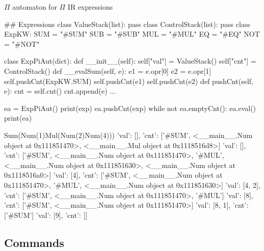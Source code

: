 \documentclass{beamer}
\begin{document}

\begin{frame}{{\color{red}$\Pi$ automaton} for {\color{red}$\Pi$ IR} expressions}

\begin{python}
## Expressions
class ValueStack(list): pass
class ControlStack(list): pass
class ExpKW:
    SUM = "#SUM"
    SUB = "#SUB"
    MUL = "#MUL"
    EQ = "#EQ"
    NOT = "#NOT"
\end{python}

\framebreak    

\begin{python}    
class ExpPiAut(dict):
    def __init__(self):    
        self["val"] = ValueStack()
        self["cnt"] = ControlStack()
    def __evalSum(self, e):
        e1 = e.opr[0]
        e2 = e.opr[1]
        self.pushCnt(ExpKW.SUM)
        self.pushCnt(e1)
        self.pushCnt(e2)
    def pushCnt(self, e):
        cnt = self.cnt()
        cnt.append(e)
$\ldots$
\end{python}

\framebreak

\begin{python}    
ea = ExpPiAut()
print(exp)
ea.pushCnt(exp)
while not ea.emptyCnt():
    ea.eval()
    print(ea)
\end{python}

\framebreak

\begin{adjustbox}{width=2\textwidth}
\begin{python}    
Sum(Num(1)Mul(Num(2)Num(4)))
{'val': [], 'cnt': ['#SUM', <__main__.Num object at 0x111851470>, <__main__.Mul object at 0x1118516d8>]}
{'val': [], 'cnt': ['#SUM', <__main__.Num object at 0x111851470>, '#MUL', <__main__.Num object at 0x111851630>, <__main__.Num object at 0x1118516a0>]}
{'val': [4], 'cnt': ['#SUM', <__main__.Num object at 0x111851470>, '#MUL', <__main__.Num object at 0x111851630>]}
{'val': [4, 2], 'cnt': ['#SUM', <__main__.Num object at 0x111851470>, '#MUL']}
{'val': [8], 'cnt': ['#SUM', <__main__.Num object at 0x111851470>]}
{'val': [8, 1], 'cnt': ['#SUM']}
{'val': [9], 'cnt': []}
\end{python}
\end{adjustbox}

\end{frame}

\subsection{Commands}
\end{document}
